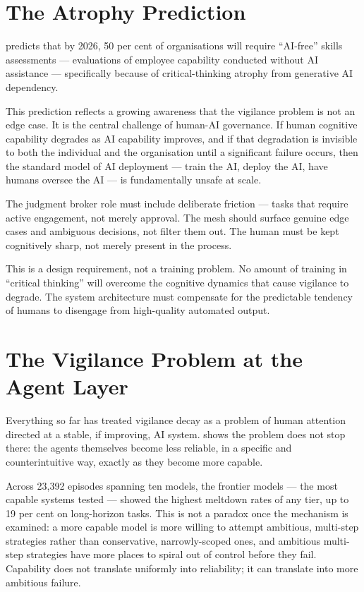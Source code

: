 \section{The Atrophy Prediction}

\textcite{Gartner2025} predicts that by 2026, 50 per cent of organisations will require ``AI-free'' skills assessments --- evaluations of employee capability conducted without AI assistance --- specifically because of critical-thinking atrophy from generative AI dependency.

This prediction reflects a growing awareness that the vigilance problem is not an edge case. It is the central challenge of human-AI governance. If human cognitive capability degrades as AI capability improves, and if that degradation is invisible to both the individual and the organisation until a significant failure occurs, then the standard model of AI deployment --- train the AI, deploy the AI, have humans oversee the AI --- is fundamentally unsafe at scale.

\begin{cautionbox}[title={Design Implication for the Agentic Mesh}]
The judgment broker role must include deliberate friction --- tasks that require active engagement, not merely approval. The mesh should surface genuine edge cases and ambiguous decisions, not filter them out. The human must be kept cognitively sharp, not merely present in the process.

This is a design requirement, not a training problem. No amount of training in ``critical thinking'' will overcome the cognitive dynamics that cause vigilance to degrade. The system architecture must compensate for the predictable tendency of humans to disengage from high-quality automated output.
\end{cautionbox}

\section{The Vigilance Problem at the Agent Layer}

Everything so far has treated vigilance decay as a problem of human attention directed at a stable, if improving, AI system. \parencite{Khanal2026} shows the problem does not stop there: the agents themselves become less reliable, in a specific and counterintuitive way, exactly as they become more capable.

Across 23,392 episodes spanning ten models, the frontier models --- the most capable systems tested --- showed the highest meltdown rates of any tier, up to 19 per cent on long-horizon tasks. This is not a paradox once the mechanism is examined: a more capable model is more willing to attempt ambitious, multi-step strategies rather than conservative, narrowly-scoped ones, and ambitious multi-step strategies have more places to spiral out of control before they fail. Capability does not translate uniformly into reliability; it can translate into more ambitious failure.

